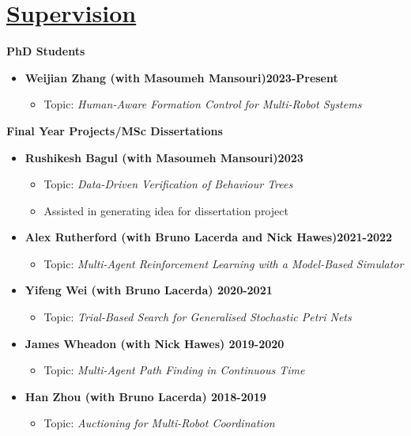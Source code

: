 \documentclass[11pt]{article}
\begin{document}
\section*{\underline{Supervision}}
\noindent \textbf{PhD Students}
\begin{itemize}
\item \textbf{Weijian Zhang (with Masoumeh Mansouri)\hfill 2023-Present}
\begin{itemize}
\item Topic: \emph{Human-Aware Formation Control for Multi-Robot Systems}
\end{itemize}
\end{itemize}


\noindent \textbf{Final Year Projects/MSc Dissertations}
\begin{itemize}
\item \textbf{Rushikesh Bagul (with Masoumeh Mansouri)\hfill 2023}
\begin{itemize}
\item Topic: \emph{Data-Driven Verification of Behaviour Trees}
\item Assisted in generating idea for dissertation project
\end{itemize}
\item \textbf{Alex Rutherford (with Bruno Lacerda and Nick Hawes)\hfill 2021-2022}
\begin{itemize}
\item Topic: \emph{Multi-Agent Reinforcement Learning with a Model-Based Simulator}
\end{itemize}
\item \textbf{Yifeng Wei (with Bruno Lacerda) \hfill 2020-2021}
\begin{itemize}
\item Topic: \emph{Trial-Based Search for Generalised Stochastic Petri Nets}
\end{itemize} 
\item \textbf{James Wheadon (with Nick Hawes) \hfill 2019-2020}
\begin{itemize}
\item  Topic: \emph{Multi-Agent Path Finding in Continuous Time}
\end{itemize}
\item \textbf{Han Zhou (with Bruno Lacerda) \hfill 2018-2019}
\begin{itemize}
\item Topic: \emph{Auctioning for Multi-Robot Coordination}
\end{itemize}
\end{itemize}
\end{document}

